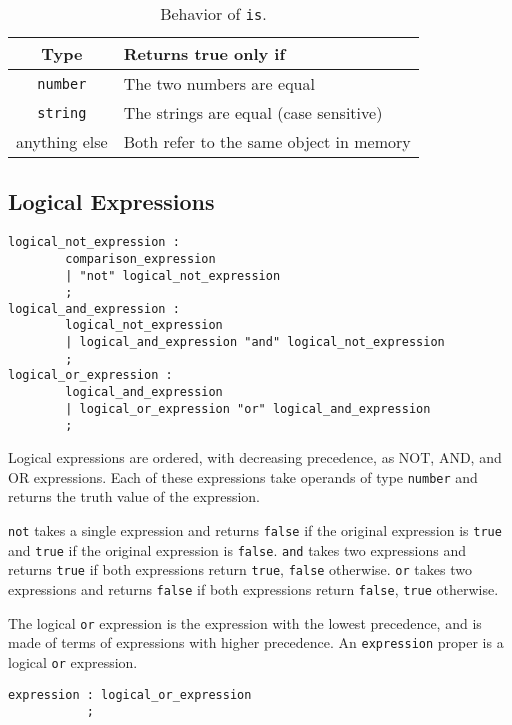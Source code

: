 \begin{table}[htdp]
\begin{center}
\begin{tabular}{|c|p{8cm}|}
\hline
Type & Returns true only if\\
\hline
\texttt{number} & The two numbers are equal\\
\texttt{string} & The strings are equal (case sensitive)\\
anything else & Both refer to the same object in memory\\
\hline
\end{tabular}
\end{center}
\caption{Behavior of \texttt{is}.}\label{isbehavior}
\end{table}

\subsection{Logical Expressions}
\begin{verbatim}
logical_not_expression : 
        comparison_expression
        | "not" logical_not_expression
        ;
logical_and_expression : 
        logical_not_expression
        | logical_and_expression "and" logical_not_expression
        ;
logical_or_expression : 
        logical_and_expression
        | logical_or_expression "or" logical_and_expression
        ;
\end{verbatim}

Logical expressions are ordered, with decreasing precedence, as NOT, AND, and OR expressions. Each of these expressions take operands of type \texttt{number} and returns the truth value of the expression.


\texttt{not} takes a single expression and returns \texttt{false} if the original expression is \texttt{true} and \texttt{true} if the original expression is \texttt{false}.
\texttt{and} takes two expressions and returns \texttt{true} if both expressions return \texttt{true}, \texttt{false} otherwise. \texttt{or} takes two expressions and returns \texttt{false} if both expressions return \texttt{false}, \texttt{true} otherwise.


The logical \texttt{or} expression is the expression with the lowest precedence, and is made of terms of expressions with higher precedence. An \texttt{expression} proper is a logical \texttt{or} expression.

\begin{verbatim}
expression : logical_or_expression
           ;
\end{verbatim}
